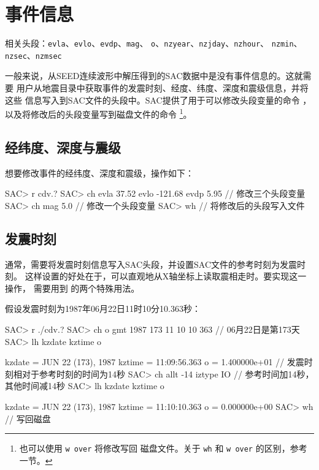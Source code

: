 \section{事件信息}
\label{sec:event-info}
相关头段：\texttt{evla}、\texttt{evlo}、\texttt{evdp}、\texttt{mag}、
    \texttt{o}、\texttt{nzyear}、\texttt{nzjday}、\texttt{nzhour}、
    \texttt{nzmin}、\texttt{nzsec}、\texttt{nzmsec}

一般来说，从SEED连续波形中解压得到的SAC数据中是没有事件信息的。这就需要
用户从地震目录中获取事件的发震时刻、经度、纬度、深度和震级信息，并将这些
信息写入到SAC文件的头段中。SAC提供了用于可以修改头段变量的命令
，以及将修改后的头段变量写到磁盘文件的命令
\footnote{也可以使用 \texttt{w over} 将修改写回
磁盘文件。关于 \texttt{wh} 和 \texttt{w over} 的区别，参考
 一节。}。

\subsection{经纬度、深度与震级}
想要修改事件的经纬度、深度和震级，操作如下：
\begin{SACCode}
SAC> r cdv.?
SAC> ch evla 37.52 evlo -121.68 evdp 5.95   // 修改三个头段变量
SAC> ch mag 5.0                             // 修改一个头段变量
SAC> wh                                     // 将修改后的头段写入文件
\end{SACCode}

\subsection{发震时刻}
通常，需要将发震时刻信息写入SAC头段，并设置SAC文件的参考时刻为发震时刻。
这样设置的好处在于，可以直观地从X轴坐标上读取震相走时。要实现这一操作，
需要用到  的两个特殊用法。

假设发震时刻为1987年06月22日11时10分10.363秒：
\label{code:origin-time}
\begin{SACCode}
SAC> r ./cdv.?
SAC> ch o gmt 1987 173 11 10 10 363   // 06月22日是第173天
SAC> lh kzdate kztime o

     kzdate = JUN 22 (173), 1987
     kztime = 11:09:56.363
          o = 1.400000e+01       // 发震时刻相对于参考时刻的时间为14秒
SAC> ch allt -14 iztype IO       // 参考时间加14秒，其他时间减14秒
SAC> lh kzdate kztime o

     kzdate = JUN 22 (173), 1987
     kztime = 11:10:10.363
          o = 0.000000e+00
SAC> wh                          // 写回磁盘
\end{SACCode}

